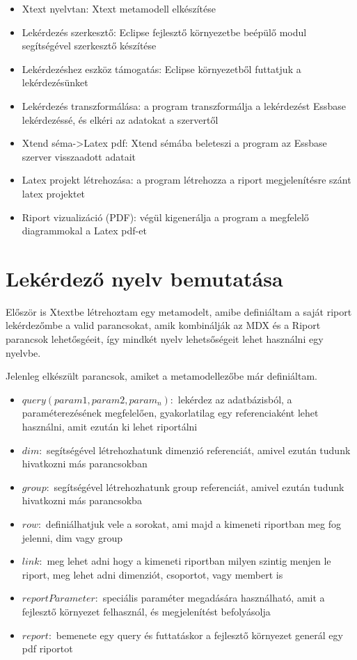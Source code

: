 \begin{itemize}
  \item Xtext nyelvtan: Xtext metamodell elkészítése
  \item Lekérdezés szerkesztő: Eclipse fejlesztő környezetbe beépülő modul segítségével szerkesztő készítése
  \item Lekérdezéshez eszköz támogatás: Eclipse környezetből futtatjuk a lekérdezésünket
  \item Lekérdezés transzformálása: a program transzformálja a lekérdezést Essbase lekérdezéssé, és elkéri az adatokat a szervertől
  \item Xtend séma->Latex pdf: Xtend sémába beleteszi a program az Essbase szerver visszaadott adatait
  \item Latex projekt létrehozása: a program létrehozza a riport megjelenítésre szánt latex projektet
  \item Riport vizualizáció (PDF): végül kigenerálja a program a megfelelő diagrammokal a Latex pdf-et
\end{itemize}


\section{Lekérdező nyelv bemutatása}

Először is Xtextbe létrehoztam egy metamodelt, amibe definiáltam a saját riport lekérdezőmbe a valid parancsokat, amik kombinálják az MDX és a Riport parancsok lehetősgéeit, így mindkét nyelv lehetsőségeit lehet használni egy nyelvbe.

Jelenleg elkészült parancsok, amiket a metamodellezőbe már definiáltam.
\begin{itemize}
  \item $query ( param1, param2, param_n ):$ lekérdez az adatbázisból, a paraméterezésének megfelelően,
  gyakorlatilag egy referenciaként lehet használni, amit ezután ki lehet
  riportálni
  \item $dim:$ segítségével létrehozhatunk dimenzió referenciát, amivel ezután
  tudunk hivatkozni más parancsokban
  \item $group:$ segítségével létrehozhatunk group referenciát, amivel ezután
  tudunk hivatkozni más parancsokba
  \item $row:$ definiálhatjuk vele a sorokat, ami majd a kimeneti riportban meg
  fog jelenni, dim vagy group
  \item $link:$ meg lehet adni hogy a kimeneti riportban milyen szintig menjen le
  riport, meg lehet adni dimenziót, csoportot, vagy membert is
  \item $reportParameter:$ speciális paraméter megadására használható, amit a
  fejlesztő környezet felhasznál, és megjelenítést befolyásolja
  \item $report:$ bemenete egy query és futtatáskor a fejlesztő környezet generál
  egy pdf riportot 
\end{itemize}


